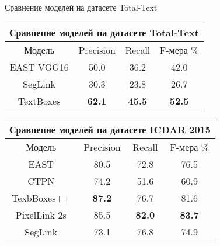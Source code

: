 \documentclass[12pt,twoside]{article}
\begin{document}
Сравнение моделей на датасете Total-Text
\begin{center}
	\begin{tabular}{|c||c|c|c|}
		\hline
		\multicolumn{4}{|c|}{Сравнение моделей на датасете Total-Text} \\
		\hline
	Модель	&  Precision &  Recall &  F-мера \(\%\)\\
	\hline
	EAST VGG16	&  50.0 & 36.2 & 42.0 \\
	SegLink	&  30.3 & 23.8 & 26.7 \\
	TextBoxes & \textbf{62.1} & \textbf{45.5} & \textbf{52.5} \\
	\hline
	\end{tabular}

\bigskip

	\begin{tabular}{|c||c|c|c|}
		\hline
		\multicolumn{4}{|c|}{Сравнение моделей на датасете ICDAR 2015} \\
		\hline
		
		Модель	&  Precision &  Recall &  F-мера \(\%\)\\
		EAST 	&  80.5&  72.8 & 76.5 \\
		CTPN	&  74.2 & 51.6 & 60.9 \\
		TexbBoxes++	&  \textbf{87.2} & 76.7 & 81.6 \\
		PixelLink 2s	&  85.5 & \textbf{82.0} & \textbf{83.7} \\
		SegLink    & 73.1 & 76.8 & 74.9 \\ 
		\hline
		
	\end{tabular}
\end{center}

 
 
\end{document}
